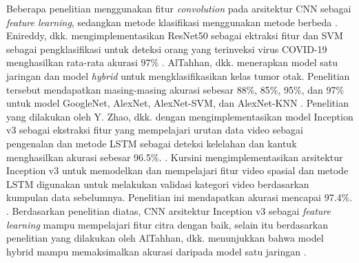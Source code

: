     Beberapa penelitian menggunakan fitur \textit{convolution} pada arsitektur CNN sebagai \textit{feature learning}, sedangkan metode klasifikasi menggunakan metode berbeda \autocite{Novitasari2022}. Enireddy, dkk. mengimplementasikan ResNet50 sebagai ektraksi fitur dan SVM sebagai pengklasifikasi untuk deteksi orang yang terinveksi virus COVID-19 menghasilkan rata-rata akurasi 97\% \autocite{Enireddy2020}. AlTahhan, dkk. menerapkan model satu jaringan dan model \textit{hybrid} untuk mengklasifikasikan kelas tumor otak. Penelitian tersebut mendapatkan masing-masing akurasi sebesar 88\%, 85\%, 95\%, dan 97\% untuk model GoogleNet, AlexNet, AlexNet-SVM, dan AlexNet-KNN \autocite{AlTahhan2023}. Penelitian yang dilakukan oleh Y. Zhao, dkk. dengan mengimplementasikan model Inception v3 sebagai ekstraksi fitur yang mempelajari urutan data video sebagai pengenalan dan metode LSTM sebagai deteksi kelelahan dan kantuk menghasilkan akurasi sebesar 96.5\%.  \autocite{Zhao2020}. Kursini mengimplementasikan arsitektur Inception v3 untuk memodelkan dan mempelajari fitur video spasial dan metode LSTM digunakan untuk melakukan validasi kategori video berdasarkan kumpulan data sebelumnya. Penelitian ini mendapatkan akurasi mencapai 97.4\%. \autocite{Kusrini2022}. Berdasarkan penelitian diatas, CNN arsitektur Inception v3 sebagai \textit{feature learning} mampu mempelajari fitur citra dengan baik, selain itu berdasarkan penelitian yang dilakukan oleh AlTahhan, dkk. menunjukkan bahwa model hybrid mampu memaksimalkan akurasi daripada model satu jaringan \autocite{AlTahhan2023}.

